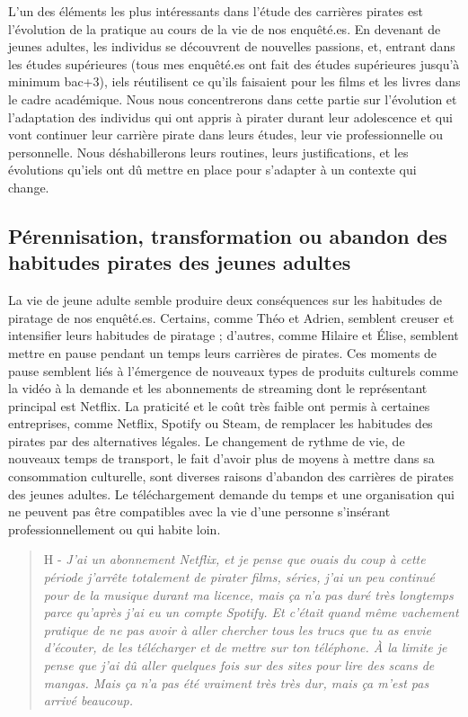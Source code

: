 L'un des éléments les plus intéressants dans l'étude des carrières pirates est l'évolution de la pratique au cours de la vie de nos enquêté.es. En devenant de jeunes adultes, les individus se découvrent de nouvelles passions, et, entrant dans les études supérieures (tous mes enquêté.es ont fait des études supérieures jusqu'à minimum bac+3), iels réutilisent ce qu'ils faisaient pour les films et les livres dans le cadre académique. Nous nous concentrerons dans cette partie sur l'évolution et l'adaptation des individus qui ont appris à pirater durant leur adolescence et qui vont continuer leur carrière pirate dans leurs études, leur vie professionnelle ou personnelle. Nous déshabillerons leurs routines, leurs justifications, et les évolutions qu'iels ont dû mettre en place pour s'adapter à un contexte qui change. %

\subsection*{Pérennisation, transformation ou abandon des habitudes pirates des jeunes adultes}

La vie de jeune adulte semble produire deux conséquences sur les habitudes de piratage de nos enquêté.es. Certains, comme Théo et Adrien, semblent creuser et intensifier leurs habitudes de piratage ; d'autres, comme Hilaire et Élise, semblent mettre en pause pendant un temps leurs carrières de pirates. Ces moments de pause semblent liés à l'émergence de nouveaux types de produits culturels comme la vidéo à la demande et les abonnements de streaming dont le représentant principal est Netflix. La praticité et le coût très faible ont permis à certaines entreprises, comme Netflix, Spotify ou Steam, de remplacer les habitudes des pirates par des alternatives légales. Le changement de rythme de vie, de nouveaux temps de transport, le fait d'avoir plus de moyens à mettre dans sa consommation culturelle, sont diverses raisons d'abandon des carrières de pirates des jeunes adultes. Le téléchargement demande du temps et une organisation qui ne peuvent pas être compatibles avec la vie d'une personne s'insérant professionnellement ou qui habite loin.  

\begin{quote}
    H - \textit{J'ai un abonnement Netflix, et je pense que ouais du coup à cette période j'arrête totalement de pirater films, séries, j'ai un peu continué pour de la musique durant ma licence, mais ça n'a pas duré très longtemps parce qu'après j'ai eu un compte Spotify. Et c'était quand même vachement pratique de ne pas avoir à aller chercher tous les trucs que tu as envie d'écouter, de les télécharger et de mettre sur ton téléphone. À la limite je pense que j'ai dû aller quelques fois sur des sites pour lire des scans de mangas. Mais ça n'a pas été vraiment très très dur, mais ça m'est pas arrivé beaucoup. }
\end{quote}

